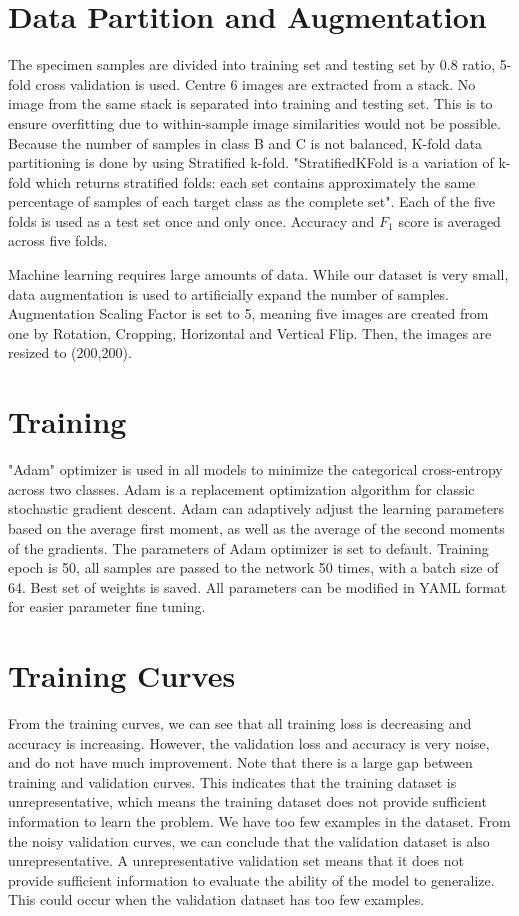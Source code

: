 \section{Data Partition and Augmentation}
The specimen samples are divided into training set and testing set by 0.8 ratio, 5-fold cross validation is used. Centre 6 images are extracted from a stack. No image from the same stack is separated into training and testing set. This is to ensure overfitting due to within-sample image similarities would not be possible. Because the number of samples in class B and C is not balanced, K-fold data partitioning is done by using Stratified k-fold. "StratifiedKFold is a variation of k-fold which returns stratified folds: each set contains approximately the same percentage of samples of each target class as the complete set". Each of the five folds is used as a test set once and only once. Accuracy and $F_1$ score is averaged across five folds.

Machine learning requires large amounts of data. While our dataset is very small, data augmentation is used to artificially expand the number of samples. Augmentation Scaling Factor is set to 5, meaning five images are created from one by Rotation, Cropping, Horizontal and Vertical Flip. Then, the images are resized to (200,200).

\section{Training}
"Adam" optimizer is used in all models to minimize the categorical cross-entropy across two classes. Adam is a replacement optimization algorithm for classic stochastic gradient descent. Adam can adaptively adjust the learning parameters based on the average first moment, as well as the average of the second moments of the gradients. The parameters of Adam optimizer is set to default. Training epoch is 50, all samples are passed to the network 50 times, with a batch size of 64. Best set of weights is saved. All parameters can be modified in YAML format for easier parameter fine tuning.


\section{Training Curves}

From the training curves, we can see that all training loss is decreasing and accuracy is increasing. However, the validation loss and accuracy is very noise, and do not have much improvement. Note that there is a large gap between training and validation curves. This indicates that the training dataset is unrepresentative, which means the training dataset does not provide sufficient information to learn the problem. We have too few examples in the dataset. From the noisy validation curves, we can conclude that the validation dataset is also unrepresentative. A  unrepresentative validation set means that it does not provide sufficient information to evaluate the ability of the model to generalize. This could occur when the validation dataset has too few examples.

